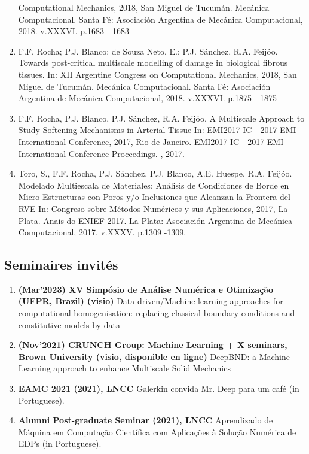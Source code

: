 \documentclass[french]{article}
\begin{document}
\begin{enumerate}
	Computational Mechanics, 2018, San Miguel de Tucumán.
	Mecánica Computacional. Santa Fé: Asociación Argentina de Mecánica Computacional, 2018. v.XXXVI.
	p.1683 - 1683
	\item F.F. Rocha; P.J. Blanco; de Souza Neto, E.; P.J. Sánchez, R.A. Feijóo.
	Towards post-critical multiscale modelling of damage in biological fibrous tissues.
	In: XII Argentine Congress on Computational Mechanics, 2018, San Miguel de Tucumán.
	Mecánica Computacional. Santa Fé: Asociación Argentina de Mecánica Computacional, 2018. v.XXXVI.
	p.1875 - 1875
	\item F.F. Rocha, P.J. Blanco, P.J. Sánchez, R.A. Feijóo.
	A Multiscale Approach to Study Softening Mechanisms in Arterial Tissue In: EMI2017-IC - 2017 EMI
	International Conference, 2017, Rio de Janeiro. EMI2017-IC - 2017 EMI International Conference Proceedings. , 2017.
	\item Toro, S., F.F. Rocha, P.J. Sánchez, P.J. Blanco, A.E. Huespe, R.A. Feijóo.
	Modelado Multiescala de Materiales: Análisis de Condiciones de Borde en Micro-Estructuras con Poros y/o
	Inclusiones que Alcanzan la Frontera del RVE In: Congreso sobre Métodos Numéricos y sus Aplicaciones,
	2017, La Plata. Anais do ENIEF 2017. La Plata: Asociación Argentina de Mecánica Computacional, 2017. v.XXXV. p.1309 -1309.
\end{enumerate}


\subsection*{Seminaires invités}
\begin{enumerate}
	\item \textbf{(Mar'2023) XV Simpósio de Análise Numérica e Otimização (UFPR, Brazil) (visio)}  Data-driven/Machine-learning approaches for computational homogenisation: replacing classical boundary conditions and constitutive models by data
	\item \textbf{(Nov'2021) CRUNCH Group: Machine Learning + X seminars, Brown University (visio, disponible en ligne)}  DeepBND: a Machine Learning approach to enhance Multiscale Solid Mechanics
	\item \textbf{EAMC 2021 (2021), LNCC} Galerkin convida Mr. Deep para um café (in Portuguese).
	\item \textbf{Alumni Post-graduate Seminar (2021), LNCC} Aprendizado de Máquina em Computação Científica com Aplicações à Solução Numérica de EDPs (in Portuguese).
\end{enumerate}
\end{document}
